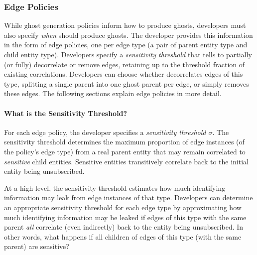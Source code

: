 %

\subsubsection{Edge Policies}
While ghost generation policies inform \sys how to produce ghosts, developers must also specify
\emph{when} \sys should produce ghosts. 
The developer provides \sys this information in the form of edge policies, one per edge type (a pair of parent
entity type and child entity type). 
Developers specify a
\emph{sensitivity threshold} that tells \sys to partially (or fully) decorrelate or remove edges,
retaining up to the threshold fraction of existing correlations.
Developers can choose whether \sys decorrelates edges of this type, splitting a single parent
into one ghost parent per edge, or simply removes these edges. 
The following sections explain edge policies in more detail.

\paragraph{What is the Sensitivity Threshold?}
For each edge policy, the developer specifies a \emph{sensitivity
threshold $\sigma$}. 
%
The sensitivity threshold determines the maximum proportion of edge instances (of the policy's edge
type) from a real parent entity that may remain correlated to \emph{sensitive} child entities.
Sensitive entities transitively correlate back to the initial entity being unsubscribed. 

At a high level, the sensitivity threshold estimates how much identifying information may leak from
edge instances of that type. Developers can determine an appropriate sensitivity threshold for each
edge type by approximating how much identifying information may be leaked if edges of this type with
the same parent \emph{all} correlate (even indirectly) back to the entity being unsubscribed. In
other words, what happens if all children of edges of this type (with the same parent) are
sensitive?

